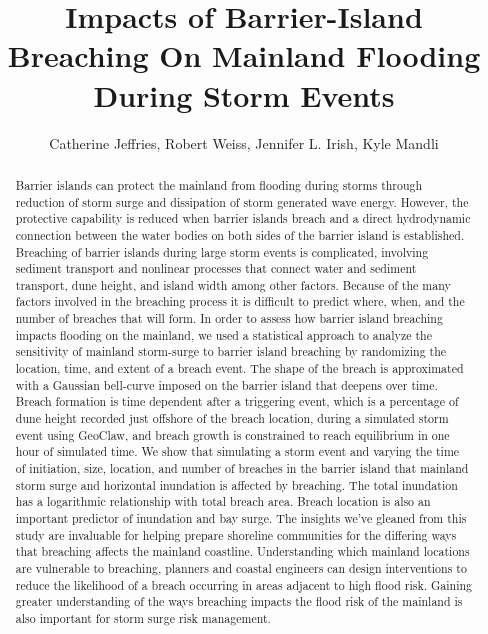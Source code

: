\documentclass{coastal_paper}
\title{Impacts of Barrier-Island Breaching On Mainland Flooding During Storm Events}
\author{Catherine Jeffries, Robert Weiss, Jennifer L. Irish, Kyle Mandli}
\begin{document}
\maketitle
\begin{abstract}
Barrier islands can protect the mainland from flooding during storms through reduction of storm surge and dissipation of storm generated wave energy. However, the protective capability is reduced when barrier islands breach and a direct hydrodynamic connection between the water bodies on both sides of the barrier island is established. Breaching of barrier islands during large storm events is complicated, involving sediment transport and nonlinear processes that connect water and sediment transport, dune height, and island width among other factors. Because of the many factors involved in the breaching process it is difficult to predict where, when, and the number of breaches that will form. In order to assess how barrier island breaching impacts flooding on the mainland, we used a statistical approach to analyze the sensitivity of mainland storm-surge to barrier island breaching by randomizing the location, time, and extent of a breach event. The shape of the breach is approximated with a Gaussian bell-curve imposed on the barrier island that deepens over time. Breach formation is time dependent after a triggering event, which is a percentage of dune height recorded just offshore of the breach location, during a simulated storm event using GeoClaw, and breach growth is constrained to reach equilibrium in one hour of simulated time. We show that simulating a storm event and varying the time of initiation, size, location, and number of breaches in the barrier island that mainland storm surge and horizontal inundation is affected by breaching. The total inundation has a logarithmic relationship with total breach area. Breach location is also an important predictor of inundation and bay surge. The insights we've gleaned from this study are invaluable for helping prepare shoreline communities for the differing ways that breaching affects the mainland coastline. Understanding which mainland locations are vulnerable to breaching, planners and coastal engineers can design interventions to reduce the likelihood of a breach occurring in areas adjacent to high flood risk. Gaining greater understanding of the ways breaching impacts the flood risk of the mainland is also important for storm surge risk management. 
\end{abstract}
\end{document}
